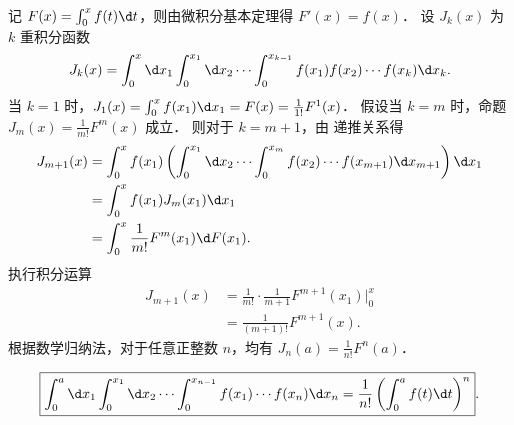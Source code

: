 \begin{myproof}
    记 $F(x) = \int_{0}^{x} f(t) \d t$，则由微积分基本定理得 $F'(x) = f(x)$．
    设 $J_k(x)$ 为 $k$ 重积分函数
    \begin{equation}
        J_k(x) = \int_{0}^{x} \d x_{1} \int_{0}^{x_{1}} \d x_{2} \cdots \int_{0}^{x_{k-1}} f(x_{1}) f(x_{2}) \cdots f(x_{k}) \d x_{k}. \label{eq:integral-def}
    \end{equation}
    当 $k=1$ 时，$J_1(x) = \int_{0}^{x} f(x_1) \d x_1 = F(x) = \frac{1}{1!} F^1(x)$．
    假设当 $k=m$ 时，命题 $J_m(x) = \frac{1}{m!} F^m(x)$ 成立．
    则对于 $k=m+1$，由  递推关系得
    \begin{equation}
        \begin{aligned}
            J_{m+1}(x) & = \int_{0}^{x} f(x_1) \left( \int_{0}^{x_1} \d x_2 \cdots \int_{0}^{x_{m}} f(x_2) \cdots f(x_{m+1}) \d x_{m+1} \right) \d x_1 \\
                       & = \int_{0}^{x} f(x_1) J_m(x_1) \d x_1                                                                                         \\
                       & = \int_{0}^{x} \frac{1}{m!} F^m(x_1) \d F(x_1).
        \end{aligned}
    \end{equation}
    执行积分运算
    \begin{equation}
        \begin{aligned}
            J_{m+1}(x) & = \frac{1}{m!} \cdot \frac{1}{m+1} F^{m+1}(x_1) \bigg|_{0}^{x} \\
                       & = \frac{1}{(m+1)!} F^{m+1}(x).
        \end{aligned}
    \end{equation}
    根据数学归纳法，对于任意正整数 $n$，均有 $J_n(a) = \frac{1}{n!} F^n(a)$．

    \begin{equation}
        \boxed{\int_{0}^{a} \d x_{1} \int_{0}^{x_{1}} \d x_{2} \cdots \int_{0}^{x_{n-1}} f(x_{1}) \cdots f(x_{n}) \d x_{n} = \frac{1}{n!} \left( \int_{0}^{a} f(t) \d t \right)^{n}}.
    \end{equation}
\end{myproof}


\endinput

